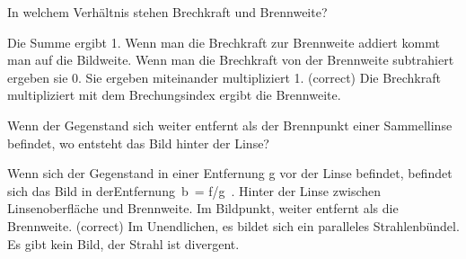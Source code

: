 \documentclass[11pt]{exam}
\begin{document}
\begin{questions}
\vspace{3mm}\question In welchem Verhältnis stehen Brechkraft und Brennweite?

\begin{choices}
	\choice Die Summe ergibt 1.
	\choice Wenn man die Brechkraft zur Brennweite addiert kommt man auf die Bildweite.
	\choice Wenn man die Brechkraft von der Brennweite subtrahiert ergeben sie 0.
	\choice Sie ergeben miteinander multipliziert 1. (correct)
	\choice Die Brechkraft multipliziert mit dem Brechungsindex ergibt die Brennweite.
\end{choices}

\vspace{3mm}\question Wenn der Gegenstand sich weiter entfernt als der Brennpunkt einer Sammellinse befindet, wo entsteht das Bild hinter der Linse?

\begin{choices}
	\choice Wenn sich der Gegenstand in einer Entfernung g vor der Linse befindet, befindet sich das Bild in derEntfernung b = f/g .
	\choice Hinter der Linse zwischen Linsenoberfläche und Brennweite.
	\choice Im Bildpunkt, weiter entfernt als die Brennweite. (correct)
	\choice Im Unendlichen, es bildet sich ein paralleles Strahlenbündel.
	\choice Es gibt kein Bild, der Strahl ist divergent.
\end{choices}

\vspace{3mm}\end{questions}
\end{document}
